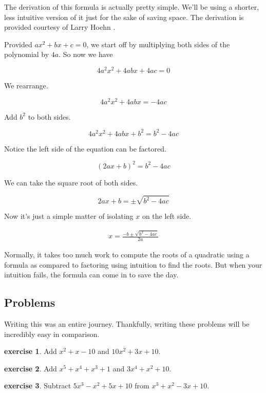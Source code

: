 \documentclass{scrbook}
\theoremstyle{definition}
\newtheorem{exercise}{exercise}[subsection]
\begin{document}
The derivation of this formula is actually pretty simple. We'll be using a shorter, less intuitive version of it just for the sake of saving space. The derivation is provided courtesy of Larry Hoehn \cite{hoehn:1975}.

Provided $ax^2 + bx + c = 0$, we start off by multiplying both sides of the polynomial by $4a$. So now we have

\[
  4a^2x^2 + 4abx + 4ac = 0
\]

We rearrange.

\[
  4a^2x^2 + 4abx = -4ac
\]

Add $b^2$ to both sides.

\[
  4a^2x^2 + 4abx + b^2 = b^2-4ac
\]

Notice the left side of the equation can be factored.

\[
  (2ax + b)^2 = b^2-4ac
\]

We can take the square root of both sides.

\[
  2ax + b = \pm\sqrt{b^2-4ac}
\]

Now it's just a simple matter of isolating $x$ on the left side.

\begin{align*}
  x = \frac{-b \pm \sqrt{b^2 - 4ac}}{2a}
\end{align*}

Normally, it takes too much work to compute the roots of a quadratic using a formula as compared to factoring using intuition to find the roots. But when your intuition fails, the formula can come in to save the day.

\subsection{Problems}

Writing this was an entire journey. Thankfully, writing these problems will be incredibly easy in comparison.

\begin{exercise}
  Add $x^2 + x - 10$ and $10x^2 + 3x + 10$.
\end{exercise}

\begin{exercise}
  Add $x^5 + x^4 + x^3 + 1$ and $3x^4 + x^2 + 10$.
\end{exercise}

\begin{exercise}
  Subtract $5x^3 - x^2 + 5x + 10$ from $x^3 + x^2 - 3x + 10$.
\end{exercise}
\end{document}
